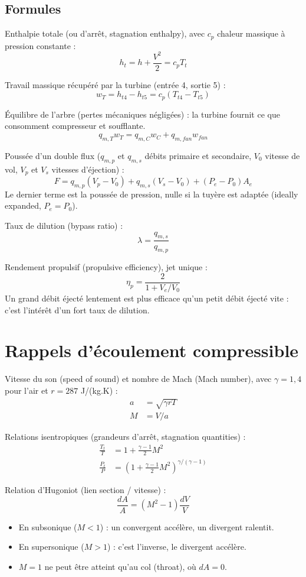 \documentclass{article}
\begin{document}
\subsection{Formules}
Enthalpie totale (ou d'arrêt, stagnation enthalpy), avec $c_p$ chaleur massique à pression constante :
\[ h_t = h + \frac{V^2}{2} = c_p T_t \]

Travail massique récupéré par la turbine (entrée 4, sortie 5) :
\[ w_T = h_{t4} - h_{t5} = c_p (T_{t4} - T_{t5}) \]

Équilibre de l'arbre (pertes mécaniques négligées) : la turbine fournit ce que consomment compresseur et soufflante.
\[ q_{m,T} w_T = q_{m,C} w_C + q_{m,fan} w_{fan} \]

Poussée d'un double flux ($q_{m,p}$ et $q_{m,s}$ débits primaire et secondaire, $V_0$ vitesse de vol, $V_p$ et $V_s$ vitesses d'éjection) :
\[ F = q_{m,p} (V_p - V_0) + q_{m,s} (V_s - V_0) + (P_e - P_0) A_e \]
Le dernier terme est la poussée de pression, nulle si la tuyère est adaptée (ideally expanded, $P_e = P_0$).

Taux de dilution (bypass ratio) :
\[ \lambda = \frac{q_{m,s}}{q_{m,p}} \]

Rendement propulsif (propulsive efficiency), jet unique :
\[ \eta_p = \frac{2}{1 + V_e / V_0} \]
Un grand débit éjecté lentement est plus efficace qu'un petit débit éjecté vite : c'est l'intérêt d'un fort taux de dilution.

\section{Rappels d'écoulement compressible}

Vitesse du son (speed of sound) et nombre de Mach (Mach number), avec $\gamma = 1,4$ pour l'air et $r = 287$ J/(kg.K) :
\begin{align}
a &= \sqrt{\gamma r T} \\
M &= V / a
\end{align}

Relations isentropiques (grandeurs d'arrêt, stagnation quantities) :
\begin{align}
\frac{T_t}{T} &= 1 + \frac{\gamma - 1}{2} M^2 \\
\frac{P_t}{P} &= \left(1 + \frac{\gamma - 1}{2} M^2\right)^{\gamma/(\gamma - 1)}
\end{align}

Relation d'Hugoniot (lien section / vitesse) :
\[ \frac{dA}{A} = (M^2 - 1) \frac{dV}{V} \]
\begin{itemize}
\item En subsonique ($M < 1$) : un convergent accélère, un divergent ralentit.
\item En supersonique ($M > 1$) : c'est l'inverse, le divergent accélère.
\item $M = 1$ ne peut être atteint qu'au col (throat), où $dA = 0$.
\end{itemize}
\end{document}
